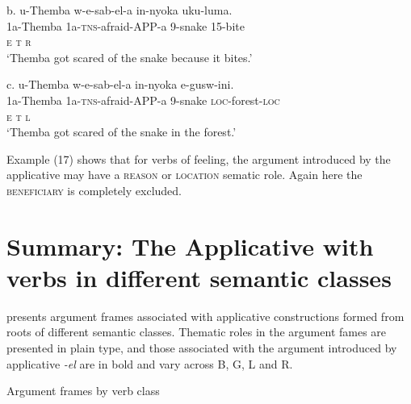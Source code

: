 \documentclass[output=paper]{langsci/langscibook}
\begin{document}
\gll   b.  u-Themba      w-e-sab-el-a      in-nyoka    uku-luma. \\
         1a-Themba      1a-\textsc{tns}{}-afraid-APP-a  9-snake  15-bite\\
         \textsc{e                    t          r}\\
\glt     ‘Themba got scared of the snake because it bites.’
\z

\gll   c.  u-Themba      w-e-sab-el-a      in-nyoka    e-gusw-ini. \\
         1a-Themba      1a-\textsc{tns}{}-afraid-APP-a  9-snake  \textsc{loc}{}-forest-\textsc{loc}\\
         \textsc{e                    t               l}\\
\glt     ‘Themba got scared of the snake in the forest.’
\z

Example (17) shows that for verbs of feeling, the argument introduced by the applicative may have a \textsc{reason} or \textsc{location} sematic role. Again here the \textsc{beneficiary} is completely excluded. 

\section{Summary: The Applicative with verbs in different semantic classes}

 presents argument frames associated with applicative constructions formed from roots of different semantic classes. Thematic roles in the argument fames are presented in plain type, and those associated with the argument introduced by applicative \textit{{}-el} are in bold and vary across B, G, L and R. 

\begin{stylelsTableHeading}%
\begin{table}
\caption{Argument frames by verb class}
\label{tab:2}
\end{table}\end{stylelsTableHeading}
\end{document}
